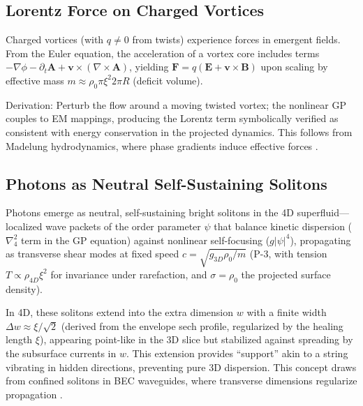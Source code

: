 \documentclass{article}
\begin{document}
\subsection{Lorentz Force on Charged Vortices}

Charged vortices (with $q \neq 0$ from twists) experience forces in emergent fields. From the Euler equation, the acceleration of a vortex core includes terms $-\nabla \phi - \partial_t \mathbf{A} + \mathbf{v} \times (\nabla \times \mathbf{A})$, yielding $\mathbf{F} = q (\mathbf{E} + \mathbf{v} \times \mathbf{B})$ upon scaling by effective mass $m \approx \rho_0 \pi \xi^2 2\pi R$ (deficit volume).

Derivation: Perturb the flow around a moving twisted vortex; the nonlinear GP couples to EM mappings, producing the Lorentz term symbolically verified as consistent with energy conservation in the projected dynamics. This follows from Madelung hydrodynamics, where phase gradients induce effective forces \cite{unruh1995sonic}.

\subsection{Photons as Neutral Self-Sustaining Solitons}

Photons emerge as neutral, self-sustaining bright solitons in the 4D superfluid---localized wave packets of the order parameter $\psi$ that balance kinetic dispersion ($\nabla_4^2$ term in the GP equation) against nonlinear self-focusing ($g |\psi|^4$), propagating as transverse shear modes at fixed speed $c = \sqrt{g_{3D} \rho_0 / m}$ (P-3, with tension $T \propto \rho_{4D} \xi^2$ for invariance under rarefaction, and $\sigma = \rho_0$ the projected surface density).

In 4D, these solitons extend into the extra dimension $w$ with a finite width $\Delta w \approx \xi / \sqrt{2}$ (derived from the envelope sech profile, regularized by the healing length $\xi$), appearing point-like in the 3D slice but stabilized against spreading by the subsurface currents in $w$. This extension provides ``support'' akin to a string vibrating in hidden directions, preventing pure 3D dispersion. This concept draws from confined solitons in BEC waveguides, where transverse dimensions regularize propagation \cite{becker2008oscillations}.
\end{document}
